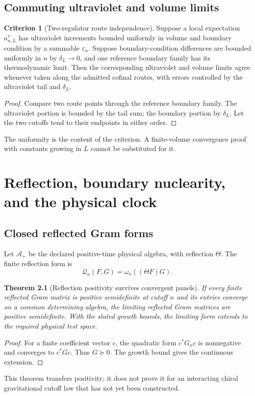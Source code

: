 \documentclass[11pt,a4paper,oneside]{book}
\theoremstyle{plain}
\newtheorem{theorem}{Theorem}[chapter]
\theoremstyle{definition}
\newtheorem{criterion}[theorem]{Criterion}
\theoremstyle{remark}
\renewcommand{\AA}{\mathcal A}
\newcommand{\src}[2]{\cite{#1}}
\begin{document}
\section{Commuting ultraviolet and volume limits}
\begin{criterion}[Two-regulator route independence]
\label{crit:double-limit}
Suppose a local expectation $a_{n,L}^{\tau}$ has ultraviolet increments bounded uniformly in volume and boundary condition by a summable $\varepsilon_n$. Suppose boundary-condition differences are bounded uniformly in $n$ by $\delta_L\to0$, and one reference boundary family has its thermodynamic limit. Then the corresponding ultraviolet and volume limits agree whenever taken along the admitted cofinal routes, with errors controlled by the ultraviolet tail and $\delta_L$.
\end{criterion}
\begin{proof}
Compare two route points through the reference boundary family. The ultraviolet portion is bounded by the tail sum; the boundary portion by $\delta_L$. Let the two cutoffs tend to their endpoints in either order.
\end{proof}
\cite{R16}
The uniformity is the content of the criterion. A finite-volume convergence proof with constants growing in $L$ cannot be substituted for it.


\chapter{Reflection, boundary nuclearity, and the physical clock}
\label{ch:reconstruction}
\section{Closed reflected Gram forms}
Let $\AA_+$ be the declared positive-time physical algebra, with reflection $\Theta$. The finite reflection form is
\begin{equation}
 \mathcal Q_n(F,G)=\omega_n((\Theta F)G).
\end{equation}

\begin{theorem}[Reflection positivity survives convergent panels]
\label{thm:rp-limit}
If every finite reflected Gram matrix is positive semidefinite at cutoff $n$ and its entries converge on a common determining algebra, the limiting reflected Gram matrices are positive semidefinite. With the stated growth bounds, the limiting form extends to the required physical test space.
\end{theorem}
\begin{proof}
For a finite coefficient vector $c$, the quadratic form $c^*G_nc$ is nonnegative and converges to $c^*Gc$. Thus $G\succeq0$. The growth bound gives the continuous extension.
\end{proof}
\src{R16}{thm:v16v87-rp-closure}
This theorem transfers positivity; it does not prove it for an interacting chiral gravitational cutoff law that has not yet been constructed.
\end{document}
